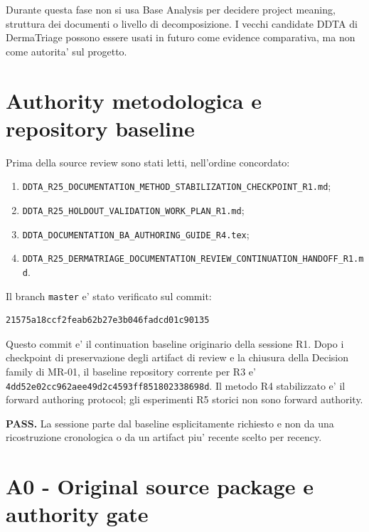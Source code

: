 \documentclass[11pt,a4paper]{article}
\begin{document}
\begin{ddtaanti}[title={Anti-contamination rule}]
Durante questa fase non si usa Base Analysis per decidere project meaning, struttura dei documenti o livello di decomposizione. I vecchi candidate DDTA di DermaTriage possono essere usati in futuro come evidence comparativa, ma non come autorita' sul progetto.
\end{ddtaanti}

\section{Authority metodologica e repository baseline}

Prima della source review sono stati letti, nell'ordine concordato:
\begin{enumerate}
  \item \texttt{DDTA\_R25\_DOCUMENTATION\_METHOD\_STABILIZATION\_CHECKPOINT\_R1.md};
  \item \texttt{DDTA\_R25\_HOLDOUT\_VALIDATION\_WORK\_PLAN\_R1.md};
  \item \texttt{DDTA\_DOCUMENTATION\_BA\_AUTHORING\_GUIDE\_R4.tex};
  \item \texttt{DDTA\_R25\_DERMATRIAGE\_DOCUMENTATION\_REVIEW\_CONTINUATION\_HANDOFF\_R1.md}.
\end{enumerate}

Il branch \texttt{master} e' stato verificato sul commit:
\begin{lstlisting}
21575a18ccf2feab62b27e3b046fadcd01c90135
\end{lstlisting}

Questo commit e' il continuation baseline originario della sessione R1. Dopo i checkpoint di preservazione degli artifact di review e la chiusura della Decision family di MR-01, il baseline repository corrente per R3 e' \texttt{4dd52e02cc962aee49d2c4593ff851802338698d}. Il metodo R4 stabilizzato e' il forward authoring protocol; gli esperimenti R5 storici non sono forward authority.

\begin{ddtacheck}[title={Repository authority gate}]
\textbf{PASS.} La sessione parte dal baseline esplicitamente richiesto e non da una ricostruzione cronologica o da un artifact piu' recente scelto per recency.
\end{ddtacheck}

\section{A0 - Original source package e authority gate}
\end{document}
